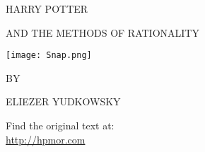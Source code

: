 \clearpage

\begin{center}
\thispagestyle{empty}
{\hp
\Huge\MakeUppercase{Harry Potter}\vspace*{0.5cm}

\Large\MakeUppercase{and the Methods of Rationality} %
 
\texttt{[image: Snap.png]} 

\Large BY \vspace*{.25cm}

\huge ELIEZER YUDKOWSKY%

\normalsize
}

\vspace{3cm}
Find the original text at:\\
\url{http://hpmor.com} \\

\end{center}

